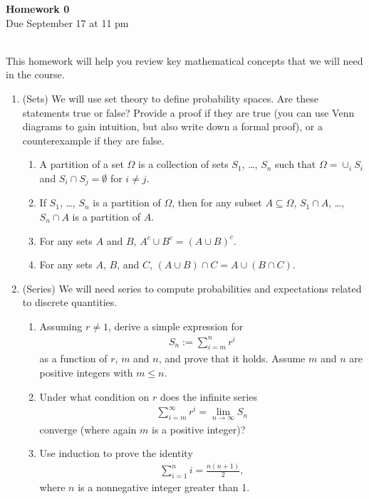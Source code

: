 \documentclass[12pt,twoside]{article}
\begin{document}
\begin{center}
{\large{\textbf{Homework 0}} } \vspace{0.2cm}\\
Due September 17 at 11 pm
\\
\end{center}
\\

This homework will help you review key mathematical concepts that we
will need in the course.
\begin{enumerate}

\item (Sets) We will use set theory to define probability spaces. Are these statements true or false? Provide a proof if they are true (you can use Venn diagrams to gain intuition, but also write down a formal proof), or a counterexample if they are false. 
\begin{enumerate}
\item[] A partition of a set $\Omega$ is a collection of sets $S_1$, \ldots, $S_n$ such that $\Omega = \cup_{i}S_i$ and $S_i \cap S_j = \emptyset$ for $i\neq j$. 
\item If  $S_1$, \ldots, $S_n$ is a partition of $\Omega$, then for any subset $A \subseteq \Omega$, $S_1 \cap A$, \ldots, $S_n \cap A$ is a partition of $A$.
\item For any sets $A$ and $B$, $A^c \cup B^c = (A \cup B)^c$. 
\item For any sets $A$, $B$, and $C$, $(A \cup B) \cap C = A \cup (B \cap C)$. 
\end{enumerate}

\item (Series) We will need series to compute probabilities and expectations related to discrete quantities. 
 \begin{enumerate}
\item  Assuming $r\neq 1$, derive a simple expression for
\begin{align}
S_n := \sum_{i=m}^{n} r^{i}
\end{align}
as a function of $r$, $m$ and $n$, and prove that it holds. Assume $m$
and $n$ are positive integers with $m\leq n$.
\item Under what condition on $r$ does the infinite series
\begin{align}
\sum_{i=m}^{\infty} r^{i} = \lim_{n \rightarrow \infty} S_n
\end{align}
converge (where again $m$ is a positive integer)?  
\item Use induction to prove the identity
\begin{align}
\sum_{i=1}^{n} i = \frac{n(n+1)}{2},
\end{align}
where $n$ is a nonnegative integer greater than 1.
\end{enumerate}



\end{enumerate}
\end{document}
